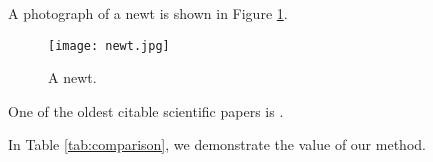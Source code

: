 A photograph of a newt is shown in Figure \ref{fig:newt}.
\begin{figure}[!h]
    \texttt{[image: newt.jpg]}
    \caption{A newt.}
    \label{fig:newt}
\end{figure}

One of the oldest citable scientific papers is \cite{van1677concerning}.


In Table \ref{tab:comparison}, we demonstrate the value of our method.
